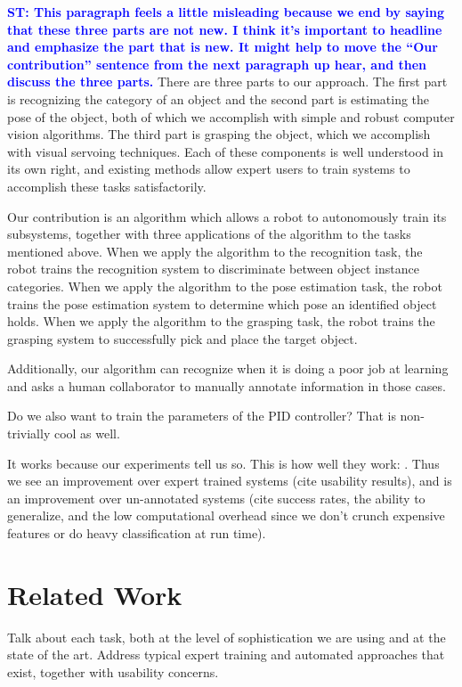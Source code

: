\documentclass[conference]{IEEEtran}
\newcommand{\stnote}[1]{\textcolor{Blue}{\textbf{ST: #1}}}
\begin{document}
\stnote{This paragraph feels a little misleading because we end by saying that these three parts are not new.  I think it's important to headline and emphasize the part that is new.  It might help to move the ``Our contribution'' sentence from the next paragraph up hear, and then discuss the three parts.}
There are three parts to our approach. The first part is recognizing the category of an
object and the second part is estimating the pose of the object, both of which we 
accomplish with simple and robust computer vision algorithms. The third
part is grasping the object, which we accomplish with visual servoing techniques. Each 
of these components is well understood in its own right, and existing methods allow 
expert users to train systems to accomplish these tasks satisfactorily. 

Our contribution
is an algorithm which allows a robot to autonomously train its subsystems, together with three
applications of the algorithm to the tasks mentioned above. When we apply 
the algorithm to the recognition task, the robot trains the recognition system to discriminate
between object instance categories. When we apply the algorithm to the pose estimation task,
the robot trains the pose estimation system to determine which pose an identified object holds. 
When we apply the algorithm to the grasping task, the robot trains the grasping system to 
successfully pick and place the target object.  

Additionally, our algorithm can recognize when it is doing a poor job at learning and
asks a human collaborator to manually annotate information in those cases.

Do we also want to train the parameters of the PID controller? That is non-trivially cool
as well.

It works because our experiments tell us so. This is how well they work: .  Thus we see an
improvement over expert trained systems (cite usability results), and is an improvement
over un-annotated systems (cite success rates, the ability to generalize, and the low
computational overhead since we don't crunch expensive features or do heavy classification
at run time).

\section{Related Work}
Talk about each task, both at the level of sophistication we are using and at the
state of the art. Address typical expert training and automated approaches that exist, 
together with usability concerns.
\end{document}
